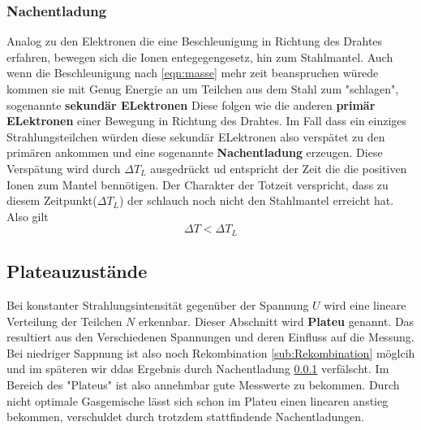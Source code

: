 \subsubsection{Nachentladung}
\label{sub:Nachentladung}
Analog zu den Elektronen die eine Beschleunigung in Richtung des Drahtes erfahren, bewegen sich die Ionen entegegengesetz, hin zum Stahlmantel.
Auch wenn die Beschleunigung nach \eqref{eqn:masse} mehr zeit beanspruchen würede kommen sie mit Genug Energie an um Teilchen aus dem Stahl zum "schlagen", sogenannte \textbf{sekundär ELektronen}
Diese folgen wie die anderen \textbf{primär ELektronen} einer Bewegung in Richtung des Drahtes. Im Fall dass ein einziges Strahlungsteilchen würden diese sekundär ELektronen also verspätet zu den primären ankommen
und eine sogenannte \textbf{Nachentladung} erzeugen. Diese Verspätung wird durch $\Delta T_L$ ausgedrückt ud entspricht der Zeit die die positiven Ionen zum Mantel bennötigen.
Der Charakter der Totzeit verspricht, dass zu diesem Zeitpunkt($\Delta T_L$) der schlauch noch nicht den Stahlmantel erreicht hat. Also gilt
\begin{equation*}
\label{eqn:vergleich}
\Delta T < \Delta T_L
\end{equation*}

\subsection{Plateauzustände}
Bei konstanter Strahlungsintensität gegenüber der Spannung $U$ wird eine lineare Verteilung der Teilchen $N$ erkennbar. Dieser Abschnitt wird 
\textbf{Plateu} genannt. Das resultiert aus den Verschiedenen Spannungen und deren Einfluss auf die Messung. Bei niedriger Sappnung ist also noch Rekombination \ref{sub:Rekombination} möglcih und im späteren wir ddas Ergebnis durch Nachentladung \ref{sub:Nachentladung} verfälscht. 
Im Bereich des "Plateus" ist also annehmbar gute Messwerte zu bekommen. Durch nicht optimale Gasgemische lässt sich schon im Plateu einen linearen anstieg bekommen,
verschuldet durch trotzdem stattfindende Nachentladungen.


